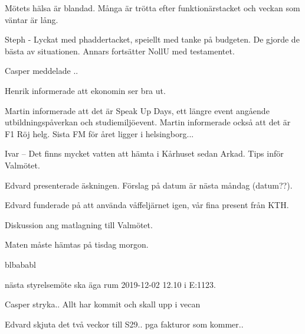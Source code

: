 \documentclass[10pt]{article}
\begin{document}
\begin{paragrafer}
\begin{paragrafer}
Mötets hälsa är blandad. Många är trötta efter funktionärstacket och veckan som väntar är lång. 

Steph - Lyckat med phaddertacket, speiellt med tanke på budgeten. De gjorde de bästa av situationen. Annars fortsätter NollU med testamentet. 



Casper meddelade ..

 
Henrik informerade att ekonomin ser bra ut.



Martin informerade att det är Speak Up Days, ett längre event angående utbildningspåverkan och studiemiljöevent. 
Martin informerade också att det är F1 Röj helg. Sista FM för året ligger i helsingborg...

Ivar -- Det finns mycket vatten att hämta i Kårhuset sedan Arkad. Tips inför Valmötet. 

\end{paragrafer}

Edvard presenterade äskningen. Förslag på datum är nästa måndag (datum??).

Edvard funderade på att använda våffeljärnet igen, vår fina present från KTH.

\Mbabay


Diskussion ang matlagning till Valmötet.

Maten måste hämtas på tisdag morgon. 

blbababl



\Mba nästa styrelsemöte ska äga rum 2019-12-02 12.10 i E:1123.


Casper \ypa stryka.. Allt har kommit och skall upp i vecan

\Mbaby

Edvard \ypa skjuta det två veckor till S29.. pga fakturor som kommer.. 

\Mbaby


\end{paragrafer}
\end{document}

